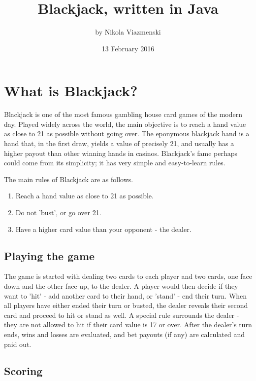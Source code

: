\documentclass[english]{article}
\begin{document}
	

\title{Blackjack, written in Java}


\author{by Nikola Viazmenski}


\date{13 February 2016}

\maketitle

\section{What is Blackjack?}

Blackjack is one of the most famous gambling house card games of the
modern day. Played widely across the world, the main objective is
to reach a hand value as close to 21 as possible without going over.
The eponymous blackjack hand is a hand that, in the first draw, yields
a value of precisely 21, and usually has a higher payout than other
winning hands in casinos. Blackjack's fame perhaps could come from
its simplicity; it has very simple and easy-to-learn rules.

The main rules of Blackjack are as follows.
\begin{enumerate}
\item Reach a hand value as close to 21 as possible.
\item Do not 'bust', or go over 21.
\item Have a higher card value than your opponent - the dealer.
\end{enumerate}

\subsection{Playing the game}

The game is started with dealing two cards to each player and two
cards, one face down and the other face-up, to the dealer. A player
would then decide if they want to 'hit' - add another card to their
hand, or 'stand' - end their turn. When all players have either ended their turn
or busted, the dealer reveals their second card and
proceed to hit or stand as well. A special rule surrounds the dealer
- they are not allowed to hit if their card value is 17 or over. After
the dealer's turn ends, wins and losses are evaluated, and bet payouts
(if any) are calculated and paid out.


\subsection{Scoring}
\end{document}
